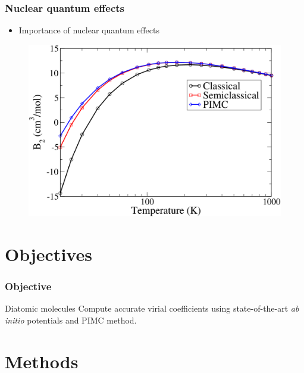\documentclass[xcolor=svgnames]{beamer}
\DeclareRobustCommand{\abinitio}[0]{\emph{ab initio}}
\begin{document}
        \begin{frame}
            \frametitle{Nuclear quantum effects}
            \begin{itemize}
                \item Importance of nuclear quantum effects
            \end{itemize}
            \begin{figure}
            \centering
            \includegraphics[scale=0.17,keepaspectratio]{B2-Kate.png}
            \end{figure}
        \end{frame}
	
    \section{Objectives}
        \begin{frame}
            \frametitle{Objective}
            \begin{block}{Diatomic molecules}
                Compute accurate virial coefficients using state-of-the-art \abinitio{} potentials and PIMC method.
            \end{block}
        \end{frame}
	\section{Methods}
\end{document}
